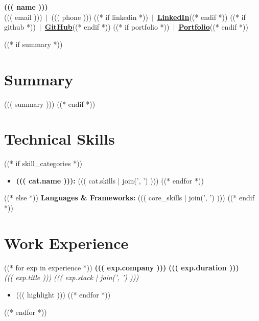 \documentclass[10pt, a4paper]{article}
\newcommand{\experienceHeading}[4]{%
    \noindent\textbf{#1} \hfill \textbf{#2} \\%
    \noindent\textit{\color{subtextColor}#3} \hfill \textit{\color{subtextColor}#4}%
    \vspace{-0.15em}%
}
\begin{document}
\begin{center}
    {\LARGE\textbf{((( name )))}}\\[0.2em]
    \small
    ((( email ))) $\,\vert\,$ ((( phone )))%
    ((* if linkedin *)) $\,\vert\,$ \href{((( linkedin )))}{\textbf{LinkedIn}}((* endif *))%
    ((* if github *)) $\,\vert\,$ \href{((( github )))}{\textbf{GitHub}}((* endif *))%
    ((* if portfolio *)) $\,\vert\,$ \href{((( portfolio )))}{\textbf{Portfolio}}((* endif *))
\end{center}
\vspace{-0.5em}

((* if summary *))
\section{Summary}
\noindent\small ((( summary )))
\vspace{0.1em}
((* endif *))

\section{Technical Skills}
\small
((* if skill_categories *))
\begin{itemize}[leftmargin=*,itemsep=-0.15em,topsep=0.1em]
((* for cat in skill_categories *))
    \item \textbf{((( cat.name ))):} ((( cat.skills | join(', ') )))
((* endfor *))
\end{itemize}
((* else *))
\noindent\textbf{Languages \& Frameworks:} ((( core_skills | join(', ') )))
((* endif *))
\vspace{-0.2em}

\section{Work Experience}
\small
((* for exp in experience *))
\experienceHeading
    {((( exp.company )))}
    {((( exp.duration )))}
    {((( exp.title )))}
    {((( exp.stack | join(', ') )))}
\begin{itemize}
((* for highlight in exp.highlights *))
    \item ((( highlight )))
((* endfor *))
\end{itemize}
\vspace{0.15em}
((* endfor *))
\vspace{-0.3em}
\end{document}

